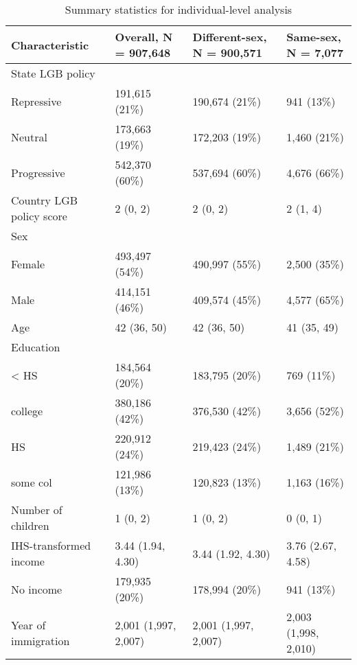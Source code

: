 \documentclass[
  11pt,
]{article}
\begin{document}
\begin{table}[!h]

\caption{\label{tab:desc-table-ind}Summary statistics for individual-level analysis}
\centering
\fontsize{8}{10}\selectfont
\begin{tabular}[t]{llll}
\toprule
Characteristic & Overall, N = 907,648 & Different-sex, N = 900,571 & Same-sex, N = 7,077\\
\midrule
State LGB policy &  &  & \\
\hspace{1em}Repressive & 191,615 (21\%) & 190,674 (21\%) & 941 (13\%)\\
\hspace{1em}Neutral & 173,663 (19\%) & 172,203 (19\%) & 1,460 (21\%)\\
\hspace{1em}Progressive & 542,370 (60\%) & 537,694 (60\%) & 4,676 (66\%)\\
Country LGB policy score & 2 (0, 2) & 2 (0, 2) & 2 (1, 4)\\
\addlinespace
Sex &  &  & \\
\hspace{1em}Female & 493,497 (54\%) & 490,997 (55\%) & 2,500 (35\%)\\
\hspace{1em}Male & 414,151 (46\%) & 409,574 (45\%) & 4,577 (65\%)\\
Age & 42 (36, 50) & 42 (36, 50) & 41 (35, 49)\\
Education &  &  & \\
\addlinespace
\hspace{1em}< HS & 184,564 (20\%) & 183,795 (20\%) & 769 (11\%)\\
\hspace{1em}college & 380,186 (42\%) & 376,530 (42\%) & 3,656 (52\%)\\
\hspace{1em}HS & 220,912 (24\%) & 219,423 (24\%) & 1,489 (21\%)\\
\hspace{1em}some col & 121,986 (13\%) & 120,823 (13\%) & 1,163 (16\%)\\
Number of children & 1 (0, 2) & 1 (0, 2) & 0 (0, 1)\\
\addlinespace
IHS-transformed income & 3.44 (1.94, 4.30) & 3.44 (1.92, 4.30) & 3.76 (2.67, 4.58)\\
No income & 179,935 (20\%) & 178,994 (20\%) & 941 (13\%)\\
Year of immigration & 2,001 (1,997, 2,007) & 2,001 (1,997, 2,007) & 2,003 (1,998, 2,010)\\

\end{tabular}
\end{table}
\end{document}
